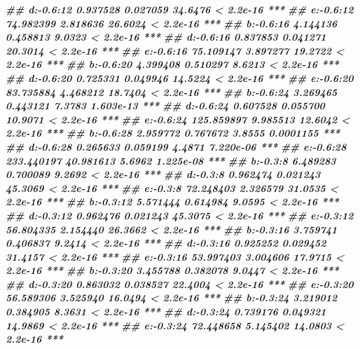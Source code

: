 \documentclass[
]{book}
\newenvironment{Shaded}{\begin{snugshade}}{\end{snugshade}}
\newcommand{\DocumentationTok}[1]{\textcolor[rgb]{0.56,0.35,0.01}{\textbf{\textit{#1}}}}
\begin{document}
\begin{Shaded}
\begin{Highlighting}[]
\DocumentationTok{\#\# d:{-}0.6:12   0.937528   0.027059 34.6476 \textless{} 2.2e{-}16 ***}
\DocumentationTok{\#\# e:{-}0.6:12  74.982399   2.818636 26.6024 \textless{} 2.2e{-}16 ***}
\DocumentationTok{\#\# b:{-}0.6:16   4.144136   0.458813  9.0323 \textless{} 2.2e{-}16 ***}
\DocumentationTok{\#\# d:{-}0.6:16   0.837853   0.041271 20.3014 \textless{} 2.2e{-}16 ***}
\DocumentationTok{\#\# e:{-}0.6:16  75.109147   3.897277 19.2722 \textless{} 2.2e{-}16 ***}
\DocumentationTok{\#\# b:{-}0.6:20   4.399408   0.510297  8.6213 \textless{} 2.2e{-}16 ***}
\DocumentationTok{\#\# d:{-}0.6:20   0.725331   0.049946 14.5224 \textless{} 2.2e{-}16 ***}
\DocumentationTok{\#\# e:{-}0.6:20  83.735884   4.468212 18.7404 \textless{} 2.2e{-}16 ***}
\DocumentationTok{\#\# b:{-}0.6:24   3.269465   0.443121  7.3783 1.603e{-}13 ***}
\DocumentationTok{\#\# d:{-}0.6:24   0.607528   0.055700 10.9071 \textless{} 2.2e{-}16 ***}
\DocumentationTok{\#\# e:{-}0.6:24 125.859897   9.985513 12.6042 \textless{} 2.2e{-}16 ***}
\DocumentationTok{\#\# b:{-}0.6:28   2.959772   0.767672  3.8555 0.0001155 ***}
\DocumentationTok{\#\# d:{-}0.6:28   0.265633   0.059199  4.4871 7.220e{-}06 ***}
\DocumentationTok{\#\# e:{-}0.6:28 233.440197  40.981613  5.6962 1.225e{-}08 ***}
\DocumentationTok{\#\# b:{-}0.3:8    6.489283   0.700089  9.2692 \textless{} 2.2e{-}16 ***}
\DocumentationTok{\#\# d:{-}0.3:8    0.962474   0.021243 45.3069 \textless{} 2.2e{-}16 ***}
\DocumentationTok{\#\# e:{-}0.3:8   72.248403   2.326579 31.0535 \textless{} 2.2e{-}16 ***}
\DocumentationTok{\#\# b:{-}0.3:12   5.571444   0.614984  9.0595 \textless{} 2.2e{-}16 ***}
\DocumentationTok{\#\# d:{-}0.3:12   0.962476   0.021243 45.3075 \textless{} 2.2e{-}16 ***}
\DocumentationTok{\#\# e:{-}0.3:12  56.804335   2.154440 26.3662 \textless{} 2.2e{-}16 ***}
\DocumentationTok{\#\# b:{-}0.3:16   3.759741   0.406837  9.2414 \textless{} 2.2e{-}16 ***}
\DocumentationTok{\#\# d:{-}0.3:16   0.925252   0.029452 31.4157 \textless{} 2.2e{-}16 ***}
\DocumentationTok{\#\# e:{-}0.3:16  53.997403   3.004606 17.9715 \textless{} 2.2e{-}16 ***}
\DocumentationTok{\#\# b:{-}0.3:20   3.455788   0.382078  9.0447 \textless{} 2.2e{-}16 ***}
\DocumentationTok{\#\# d:{-}0.3:20   0.863032   0.038527 22.4004 \textless{} 2.2e{-}16 ***}
\DocumentationTok{\#\# e:{-}0.3:20  56.589306   3.525940 16.0494 \textless{} 2.2e{-}16 ***}
\DocumentationTok{\#\# b:{-}0.3:24   3.219012   0.384905  8.3631 \textless{} 2.2e{-}16 ***}
\DocumentationTok{\#\# d:{-}0.3:24   0.739176   0.049321 14.9869 \textless{} 2.2e{-}16 ***}
\DocumentationTok{\#\# e:{-}0.3:24  72.448658   5.145402 14.0803 \textless{} 2.2e{-}16 ***}

\end{Highlighting}
\end{Shaded}
\end{document}
